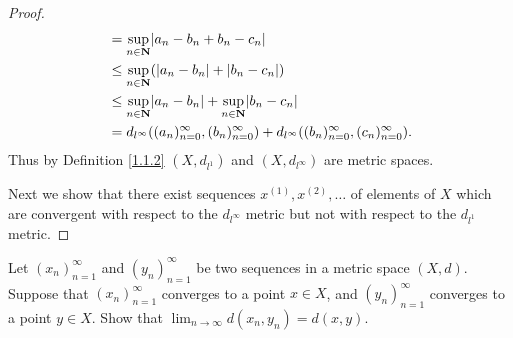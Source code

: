 \begin{proof}
\begin{align*}
                                                                 & = \sup_{n \in \mathbf{N}} \abs*{a_n - b_n + b_n - c_n}                                                                 \\
                                                                 & \leq \sup_{n \in \mathbf{N}} (\abs*{a_n - b_n} + \abs*{b_n - c_n})                                                     \\
                                                                 & \leq \sup_{n \in \mathbf{N}} \abs*{a_n - b_n} + \sup_{n \in \mathbf{N}} \abs*{b_n - c_n}                               \\
                                                                 & = d_{l^\infty}((a_n)_{n = 0}^\infty, (b_n)_{n = 0}^\infty) + d_{l^\infty}((b_n)_{n = 0}^\infty, (c_n)_{n = 0}^\infty).
    \end{align*}
    Thus by Definition \ref{1.1.2} \((X, d_{l^1})\) and \((X, d_{l^\infty})\) are metric spaces.

    Next we show that there exist sequences \(x^{(1)}, x^{(2)}, \dots\) of elements of \(X\) which are convergent with respect to the \(d_{l^\infty}\) metric but not with respect to the \(d_{l^1}\) metric.
\end{proof}

\begin{exercise}\label{ex 1.1.16}
    Let \((x_n)_{n = 1}^\infty\) and \((y_n)_{n = 1}^\infty\) be two sequences in a metric space \((X, d)\).
    Suppose that \((x_n)_{n = 1}^\infty\) converges to a point \(x \in X\), and \((y_n)_{n = 1}^\infty\) converges to a point \(y \in X\).
    Show that \(\lim_{n \to \infty} d(x_n, y_n) = d(x, y)\).
\end{exercise}